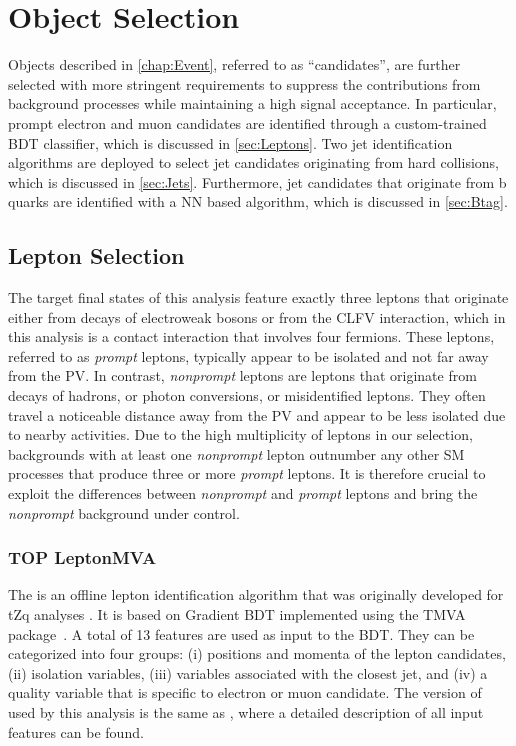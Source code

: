 \chapter{Object Selection}
\label{chap:Objects}

Objects described in \autoref{chap:Event}, referred to as ``candidates'', are further selected with more stringent requirements to suppress the contributions from background processes while maintaining a high signal acceptance. In particular, prompt electron and muon candidates are identified through a custom-trained \ac{BDT} classifier, which is discussed in \autoref{sec:Leptons}. Two jet identification algorithms are deployed to select jet candidates originating from hard collisions, which is discussed in \autoref{sec:Jets}. Furthermore, jet candidates that originate from b quarks are identified with a \ac{NN} based algorithm, which is discussed in \autoref{sec:Btag}. 
\section{Lepton Selection}
\label{sec:Leptons}

The target final states of this analysis feature exactly three leptons that originate either from decays of electroweak bosons or from the \ac{CLFV} interaction, which in this analysis is a contact interaction that involves four fermions. These leptons, referred to as \emph{prompt} leptons, typically appear to be isolated and not far away from the \ac{PV}. In contrast, \emph{nonprompt} leptons are leptons that originate from decays of hadrons, or photon conversions, or misidentified leptons. They often travel a noticeable distance away from the \ac{PV} and appear to be less isolated due to nearby activities. Due to the high multiplicity of leptons in our selection, backgrounds with at least one \emph{nonprompt} lepton outnumber any other \ac{SM} processes that produce three or more \emph{prompt} leptons. It is therefore crucial to exploit the differences between \emph{nonprompt} and \emph{prompt} leptons and bring the \emph{nonprompt} background under control. 
\subsection{TOP LeptonMVA}
\label{subsec:TOPMVA}

The \TOP is an offline lepton identification algorithm that was originally developed for tZq analyses \cite{CMS:2018sgc,CMS:2021ugv}. It is based on Gradient \ac{BDT} implemented using the TMVA package~\cite{TMVA:2007ngy}. A total of 13 features are used as input to the \ac{BDT}. They can be categorized into four groups: (i) positions and momenta of the lepton candidates, (ii) isolation variables, (iii) variables associated with the closest jet, and (iv) a quality variable that is specific to electron or muon candidate. The version of \TOP used by this analysis is the same as \cite{CMS:2021ugv}, where a detailed description of all input features can be found.

